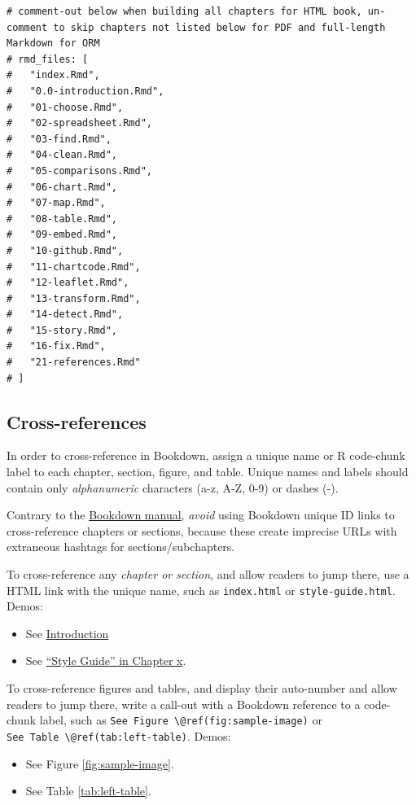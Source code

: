 \documentclass[
  english,
]{book}
\providecommand{\tightlist}{%
  \setlength{\itemsep}{0pt}\setlength{\parskip}{0pt}}
\begin{document}
\begin{verbatim}
# comment-out below when building all chapters for HTML book, un-comment to skip chapters not listed below for PDF and full-length Markdown for ORM
# rmd_files: [
#   "index.Rmd",
#   "0.0-introduction.Rmd",
#   "01-choose.Rmd",
#   "02-spreadsheet.Rmd",
#   "03-find.Rmd",
#   "04-clean.Rmd",
#   "05-comparisons.Rmd",
#   "06-chart.Rmd",
#   "07-map.Rmd",
#   "08-table.Rmd",
#   "09-embed.Rmd",
#   "10-github.Rmd",
#   "11-chartcode.Rmd",
#   "12-leaflet.Rmd",
#   "13-transform.Rmd",
#   "14-detect.Rmd",
#   "15-story.Rmd",
#   "16-fix.Rmd",
#   "21-references.Rmd"
# ]
\end{verbatim}

\hypertarget{cross-references}{%
\subsection*{Cross-references}\label{cross-references}}

In order to cross-reference in Bookdown, assign a unique name or R code-chunk label to each chapter, section, figure, and table. Unique names and labels should contain only \emph{alphanumeric} characters (a-z, A-Z, 0-9) or dashes (-).

Contrary to the \href{https://bookdown.org/yihui/bookdown/cross-references.html}{Bookdown manual}, \emph{avoid} using Bookdown unique ID links to cross-reference chapters or sections, because these create imprecise URLs with extraneous hashtags for sections/subchapters.

To cross-reference any \emph{chapter or section}, and allow readers to jump there, use a HTML link with the unique name, such as \texttt{index.html} or \texttt{style-guide.html}. Demos:

\begin{itemize}
\tightlist
\item
  See \href{index.html}{Introduction}
\item
  See \href{style-guide.html}{``Style Guide'' in Chapter x}.
\end{itemize}

To cross-reference figures and tables, and display their auto-number and allow readers to jump there, write a call-out with a Bookdown reference to a code-chunk label, such as \texttt{See\ Figure\ \textbackslash{}@ref(fig:sample-image)} or \texttt{See\ Table\ \textbackslash{}@ref(tab:left-table)}. Demos:

\begin{itemize}
\tightlist
\item
  See Figure \ref{fig:sample-image}.
\item
  See Table \ref{tab:left-table}.
\end{itemize}
\end{document}
